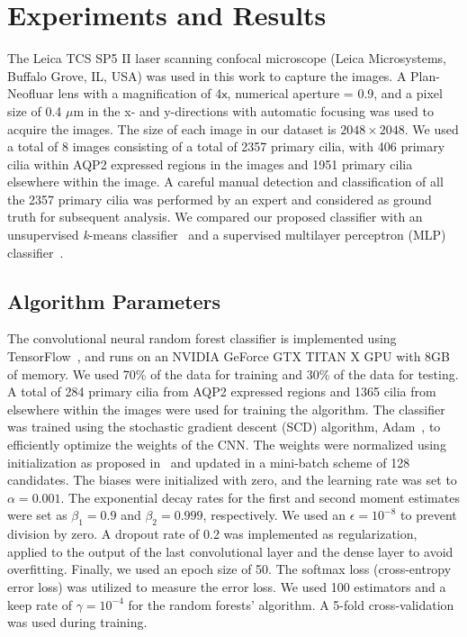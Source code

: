 \section{Experiments and Results}
The Leica TCS SP5 II laser scanning confocal microscope (Leica Microsystems, Buffalo Grove, IL, USA) was used in this work to capture the images. A Plan-Neofluar lens with a magnification of 4$\textsf{x}$, numerical aperture = 0.9, and a pixel size of 0.4 $\mu$m in the x- and y-directions with automatic focusing was used to acquire the images. The size of each image in our dataset is $2048 \times 2048$. We used a total of 8 images consisting of a total of 2357 primary cilia, with 406 primary cilia within AQP2 expressed regions in the images and 1951 primary cilia elsewhere within the image. A careful manual detection and classification of all the 2357 primary cilia was performed by an expert and considered as ground truth for subsequent analysis. We compared our proposed classifier with an unsupervised \emph{k}-means classifier~\cite{dundar_Simplicity_2015} and a supervised multilayer perceptron (MLP) classifier~\cite{haykin_Neural_2009}.

\subsection{Algorithm Parameters}
The convolutional neural random forest classifier is implemented using TensorFlow~\cite{abadi_tensorflowlarge_2016}, and runs on an NVIDIA GeForce GTX TITAN X GPU with 8GB of memory. We used 70\% of the data for training and 30\% of the data for testing. A total of 284 primary cilia from AQP2 expressed regions and 1365 cilia from elsewhere within the images were used for training the algorithm. The classifier was trained using the stochastic gradient descent (SCD) algorithm, Adam~\cite{kingma_Adam_2014}, to efficiently optimize the weights of the CNN\@. The weights were normalized using initialization as proposed in~\cite{gupta_Convolutional_2017} and updated in a mini-batch scheme of 128 candidates. The biases were initialized with zero, and the learning rate was set to $\alpha = 0.001$. The exponential decay rates for the first and second moment estimates were set as $\beta_{1} = 0.9$ and $\beta_{2} = 0.999$, respectively. We used an $\epsilon = 10^{-8}$ to prevent division by zero. A dropout rate of 0.2 was implemented as regularization, applied to the output of the last convolutional layer and the dense layer to avoid overfitting. Finally, we used an epoch size of 50. The softmax loss (cross-entropy error loss) was utilized to measure the error loss. We used 100 estimators and a keep rate of $\gamma = 10^{-4}$ for the random forests' algorithm. A 5-fold cross-validation was used during training.%

